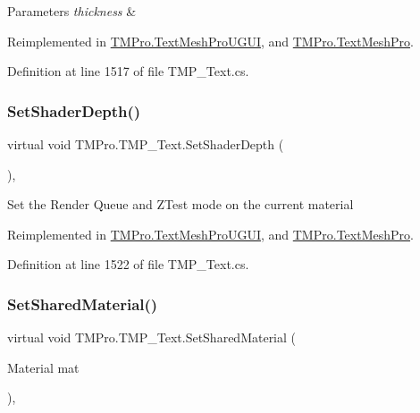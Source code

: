 \begin{DoxyParams}{Parameters}
{\em thickness} & \\
\hline
\end{DoxyParams}


Reimplemented in \mbox{\hyperlink{class_t_m_pro_1_1_text_mesh_pro_u_g_u_i_a2f3dda7925344d1798b83d85e8c81361}{T\+M\+Pro.\+Text\+Mesh\+Pro\+U\+G\+UI}}, and \mbox{\hyperlink{class_t_m_pro_1_1_text_mesh_pro_a056fd074419594f0dde096f9b264dc90}{T\+M\+Pro.\+Text\+Mesh\+Pro}}.



Definition at line 1517 of file T\+M\+P\+\_\+\+Text.\+cs.

\mbox{\label{class_t_m_pro_1_1_t_m_p___text_a311f4fd9aa77c8cd143b686f555aa579}} 
\subsubsection{\texorpdfstring{SetShaderDepth()}{SetShaderDepth()}}
{\footnotesize\ttfamily virtual void T\+M\+Pro.\+T\+M\+P\+\_\+\+Text.\+Set\+Shader\+Depth (\begin{DoxyParamCaption}{ }\end{DoxyParamCaption})\hspace{0.3cm}{\ttfamily [protected]}, {\ttfamily [virtual]}}



Set the Render Queue and Z\+Test mode on the current material 



Reimplemented in \mbox{\hyperlink{class_t_m_pro_1_1_text_mesh_pro_u_g_u_i_a764d47b0d54909e0e981e6ab50e95191}{T\+M\+Pro.\+Text\+Mesh\+Pro\+U\+G\+UI}}, and \mbox{\hyperlink{class_t_m_pro_1_1_text_mesh_pro_a3039c7fdff495b48bcefedd0d0d3bc07}{T\+M\+Pro.\+Text\+Mesh\+Pro}}.



Definition at line 1522 of file T\+M\+P\+\_\+\+Text.\+cs.

\mbox{\label{class_t_m_pro_1_1_t_m_p___text_abccb3148b9e3fceee9b80807d75c0196}} 
\subsubsection{\texorpdfstring{SetSharedMaterial()}{SetSharedMaterial()}}
{\footnotesize\ttfamily virtual void T\+M\+Pro.\+T\+M\+P\+\_\+\+Text.\+Set\+Shared\+Material (\begin{DoxyParamCaption}\item[{Material}]{mat }\end{DoxyParamCaption})\hspace{0.3cm}{\ttfamily [protected]}, {\ttfamily [virtual]}}



